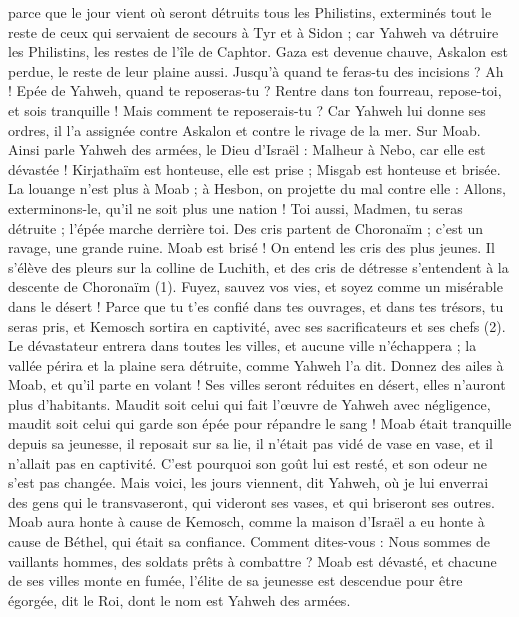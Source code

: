 \begin{multicols}{2}
parce que le jour vient où seront détruits tous les Philistins, exterminés tout le reste de ceux qui servaient de secours à Tyr et à Sidon ; car Yahweh va détruire les Philistins, les restes de l'île de Caphtor.
Gaza est devenue chauve, Askalon est perdue, le reste de leur plaine aussi. Jusqu’à quand te feras-tu des incisions ?
Ah ! Epée de Yahweh, quand te reposeras-tu ? Rentre dans ton fourreau, repose-toi, et sois tranquille !
Mais comment te reposerais-tu ? Car Yahweh lui donne ses ordres, il l'a assignée contre Askalon et contre le rivage de la mer.
\VerseOne{}Sur Moab. Ainsi parle Yahweh des armées, le Dieu d'Israël : Malheur à Nebo, car elle est dévastée ! Kirjathaïm est honteuse, elle est prise ; Misgab est honteuse et brisée.
La louange n'est plus à Moab ; à Hesbon, on projette du mal contre elle : Allons, exterminons-le, qu'il ne soit plus une nation ! Toi aussi, Madmen, tu seras détruite ; l'épée marche derrière toi.
Des cris partent de Choronaïm ; c'est un ravage, une grande ruine.
Moab est brisé ! On entend les cris des plus jeunes.
Il s'élève des pleurs sur la colline de Luchith, et des cris de détresse s'entendent à la descente de Choronaïm\FTNT{} (1).
Fuyez, sauvez vos vies, et soyez comme un misérable dans le désert !
Parce que tu t'es confié dans tes ouvrages, et dans tes trésors, tu seras pris, et Kemosch sortira en captivité, avec ses sacrificateurs et ses chefs\FTNT{} (2).
Le dévastateur entrera dans toutes les villes, et aucune ville n'échappera ; la vallée périra et la plaine sera détruite, comme Yahweh l’a dit.
Donnez des ailes à Moab, et qu'il parte en volant ! Ses villes seront réduites en désert, elles n'auront plus d'habitants.
Maudit soit celui qui fait l'œuvre de Yahweh avec négligence, maudit soit celui qui garde son épée pour répandre le sang !
Moab était tranquille depuis sa jeunesse, il reposait sur sa lie, il n'était pas vidé de vase en vase, et il n'allait pas en captivité. C'est pourquoi son goût lui est resté, et son odeur ne s'est pas changée.
Mais voici, les jours viennent, dit Yahweh, où je lui enverrai des gens qui le transvaseront, qui videront ses vases, et qui briseront ses outres.
Moab aura honte à cause de Kemosch, comme la maison d'Israël a eu honte à cause de Béthel, qui était sa confiance.
Comment dites-vous : Nous sommes de vaillants hommes, des soldats prêts à combattre ?
Moab est dévasté, et chacune de ses villes monte en fumée, l'élite de sa jeunesse est descendue pour être égorgée, dit le Roi, dont le nom est Yahweh des armées.

\end{multicols}
